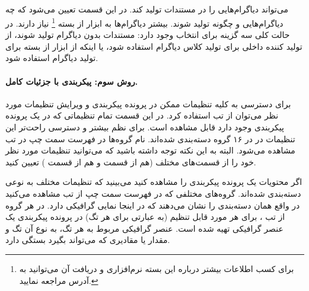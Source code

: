 \subparagraph{}
می‌تواند دیاگرام‌هایی را در مستندات تولید کند. در این قسمت تعیین می‌شود که چه
دیاگرام‌هایی و چگونه تولید شوند.
بیشتر دیاگرام‌ها به ابزار  از بسته \footnote{ برای کسب
اطلاعات بیشتر درباره این بسته نرم‌افزاری و دریافت آن می‌توانید به آدرس
 مراجعه نمایید.} نیاز دارند. در حالت کلی سه گزینه
برای انتخاب وجود دارد: مستندات بدون دیاگرام تولید شوند، از تولید کننده داخلی
برای تولید کلاس دیاگرام استفاده شود، یا اینکه از ابزار  از بسته
 برای تولید دیاگرام استفاده شود.

\paragraph{روش سوم: پیکربندی با جزئیات کامل.}
برای دسترسی به کلیه تنظیمات ممکن در پرونده پیکربندی و ویرایش تنظیمات مورد نظر
می‌توان از تب  استفاده کرد. در این قسمت تمام تنظیماتی که در یک پرونده
پیکربندی  وجود دارد قابل مشاهده است. برای نظم بیشتر و دسترسی راحت‌تر
این تنظیمات در در ۱۶ گروه دسته‌بندی شده‌اند. نام گروه‌ها در فهرست سمت چپ در تب
 مشاهده می‌شود.
البته به این نکته توجه داشته باشید که می‌توانید تنظیمات مورد نظر خود را از
قسمت‌های مختلف (هم از قسمت  و هم از قسمت ) تعیین کنید.

اگر محتویات یک پرونده پیکربندی را مشاهده کنید می‌بینید که تنظیمات مختلف به نوعی
دسته‌بندی شده‌اند. گروه‌های مختلفی که در فهرست سمت چپ از تب  مشاهده
می‌کنید در واقع همان دسته‌بندی را نشان می‌دهند که در اینجا نمایی گرافیکی دارد.
در هر گروه از تب ، برای هر مورد قابل تنظیم (به عبارتی برای هر تگ) در
پرونده پیکربندی یک عنصر گرافیکی تهیه شده است. عنصر گرافیکی مربوط به هر تگ، به
نوع آن تگ و  مقدار یا مقادیری که می‌تواند بگیرد بستگی دارد.

